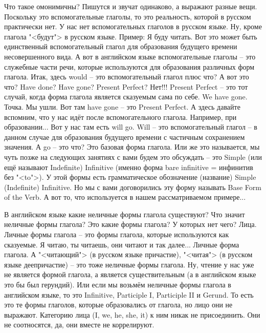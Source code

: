 \documentclass[main.tex]{subfiles}
\begin{document}
Что такое омонимичны?
Пишутся и звучат одинаково, а выражают разные вещи.
Поскольку это вспомогательные глаголы, то это реальность, которой в русском практически нет.
У нас нет вспомогательных глаголов в русском языке.
Ну, кроме глагола "<будут"> в русском языке.
Пример: Я буду читать.
Вот это может быть единственный вспомогательный глагол для образования будущего времени несовершенного вида.
А вот в английском языке вспомогательные глаголы -- это служебные части речи, которые используются для образования различных форм глагола.
Итак, здесь would -- это вспомогательный глагол плюс что?
А вот это что?
Have done?
Have gone?
Present Perfect?
Нет!!!
Present Perfect -- это тот случай, когда форма глагола является сказуемым сама по себе.
We have gone.
Точка.
Мы ушли.
Вот там have gone -- это Present Perfect.
А здесь давайте вспомним, что у нас идёт после вспомогательного глагола.
Например, при образовании...
Вот у нас там есть will go.
Will -- это вспомогательный глагол -- в данном случае для образования будущего времени с частичным сохранением значения.
А go -- это что?
Это базовая форма глагола.
Или же это называется, мы чуть позже на следующих занятиях с вами будем это обсуждать -- это Simple (или ещё называют Indefinite) Infinitive (именно форма bare infinitive = инфинитив без "<to">).
У этой формы есть грамматическое обозначение (название) Simple (Indefinite) Infinitive.
Но мы с вами договорились эту форму называть Base Form of the Verb.
А вот то, что используется в нашем рассматриваемом примере...

В английском языке какие неличные формы глагола существуют?
Что значит неличные формы глагола?
Это какие формы глагола?
У которых нет чего?
Лица.
Личные формы глагола -- это формы глагола, которые используются как сказуемые.
Я читаю, ты читаешь, они читают и так далее...
Личные форма глагола.
А "<читающий"> (в русском языке причастие), "<читая"> (в русском языке деепричастие) -- это тоже неличные формы глагола.
Ну, чтение у нас уже не является формой глагола, а является существительным (а в английском языке это бы был герундий).
Или если мы возьмём неличные формы глагола в английском языке, то это Infinitive, Participle I, Participle II и Gerund.
То есть это те формы глаголов, которые образовались от глагола, но лицо они не выражают.
Категорию лица (I, we, he, she, it) к ним никак не присоединить.
Они не соотносятся, да, они вместе не коррелируют.
\end{document}
